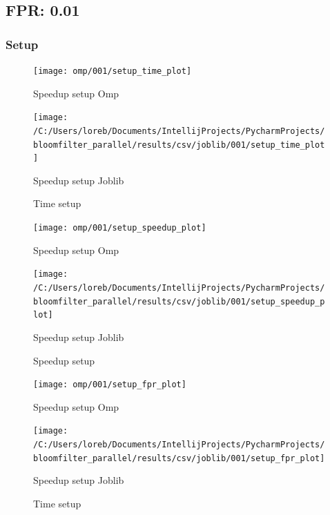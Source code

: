 \documentclass[11pt]{article}
\begin{document}
    \subsection{FPR: 0.01}\label{subsec:fpr-001}
    \subsubsection{Setup}\label{subsubsec:setup}
    \begin{figure}[H]
        \centering
        \texttt{[image: omp/001/setup\_time\_plot]}
            \caption{Speedup setup Omp}\label{fig:setup_time_omp}
        \endminipage\hfill
        \texttt{[image: /C:/Users/loreb/Documents/IntellijProjects/PycharmProjects/bloomfilter\_parallel/results/csv/joblib/001/setup\_time\_plot]}
            \caption{Speedup setup Joblib}\label{fig:setup_time_joblib}
        \endminipage\hfill
        \caption{Time setup}
    \end{figure}
    \begin{figure}[H]
        \centering
        \texttt{[image: omp/001/setup\_speedup\_plot]}
            \caption{Speedup setup Omp}\label{fig:setup_speedup_omp}
        \endminipage\hfill
        \texttt{[image: /C:/Users/loreb/Documents/IntellijProjects/PycharmProjects/bloomfilter\_parallel/results/csv/joblib/001/setup\_speedup\_plot]}
            \caption{Speedup setup Joblib}\label{fig:setup_speedup_joblib}
        \endminipage\hfill
        \caption{Speedup setup}
    \end{figure}
    \begin{figure}[H]
        \centering
        \texttt{[image: omp/001/setup\_fpr\_plot]}
            \caption{Speedup setup Omp}\label{fig:setup_fpr_omp}
        \endminipage\hfill
        \texttt{[image: /C:/Users/loreb/Documents/IntellijProjects/PycharmProjects/bloomfilter\_parallel/results/csv/joblib/001/setup\_fpr\_plot]}
            \caption{Speedup setup Joblib}\label{fig:setup_fpr_joblib}
        \endminipage\hfill
        \caption{Time setup}
    \end{figure}
\end{document}

